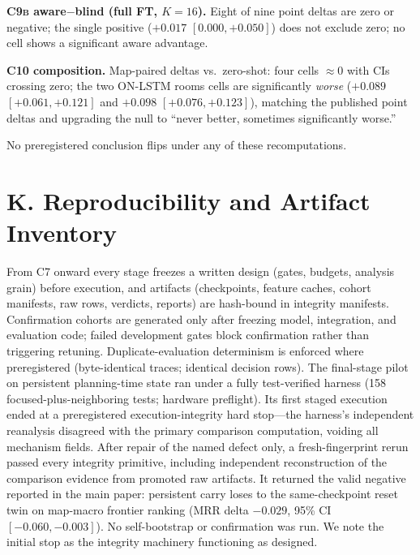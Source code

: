 \documentclass[letterpaper]{article} %
\newcommand{\stage}[1]{\textsc{#1}}
\begin{document}
\textbf{\stage{C9b} aware$-$blind (full FT, $K{=}16$).} Eight of nine point deltas are zero or negative; the single positive ($+0.017$ $[0.000,+0.050]$) does not exclude zero; no cell shows a significant aware advantage.

\textbf{\stage{C10} composition.} Map-paired deltas vs.\ zero-shot: four cells $\approx$0 with CIs crossing zero; the two ON-LSTM rooms cells are significantly \emph{worse} ($+0.089$ $[+0.061,+0.121]$ and $+0.098$ $[+0.076,+0.123]$), matching the published point deltas and upgrading the null to ``never better, sometimes significantly worse.''

No preregistered conclusion flips under any of these recomputations.

\section{K. Reproducibility and Artifact Inventory}

From \stage{C7} onward every stage freezes a written design (gates, budgets, analysis grain) before execution, and artifacts (checkpoints, feature caches, cohort manifests, raw rows, verdicts, reports) are hash-bound in integrity manifests. Confirmation cohorts are generated only after freezing model, integration, and evaluation code; failed development gates block confirmation rather than triggering retuning. Duplicate-evaluation determinism is enforced where preregistered (byte-identical traces; identical decision rows). The final-stage pilot on persistent planning-time state ran under a fully test-verified harness (158 focused-plus-neighboring tests; hardware preflight). Its first staged execution ended at a preregistered execution-integrity hard stop---the harness's independent reanalysis disagreed with the primary comparison computation, voiding all mechanism fields. After repair of the named defect only, a fresh-fingerprint rerun passed every integrity primitive, including independent reconstruction of the comparison evidence from promoted raw artifacts. It returned the valid negative reported in the main paper: persistent carry loses to the same-checkpoint reset twin on map-macro frontier ranking (MRR delta $-0.029$, 95\% CI $[-0.060,-0.003]$). No self-bootstrap or confirmation was run. We note the initial stop as the integrity machinery functioning as designed.
\end{document}
